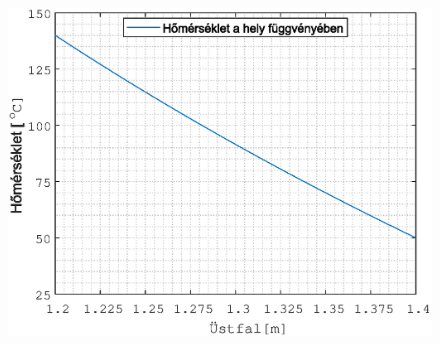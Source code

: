 \begin{figure}
	\includegraphics[width=1\linewidth]{homersekletfuggvenyHS9.eps}
	\caption{}
	\label{fig:waveforms}
\end{figure}

